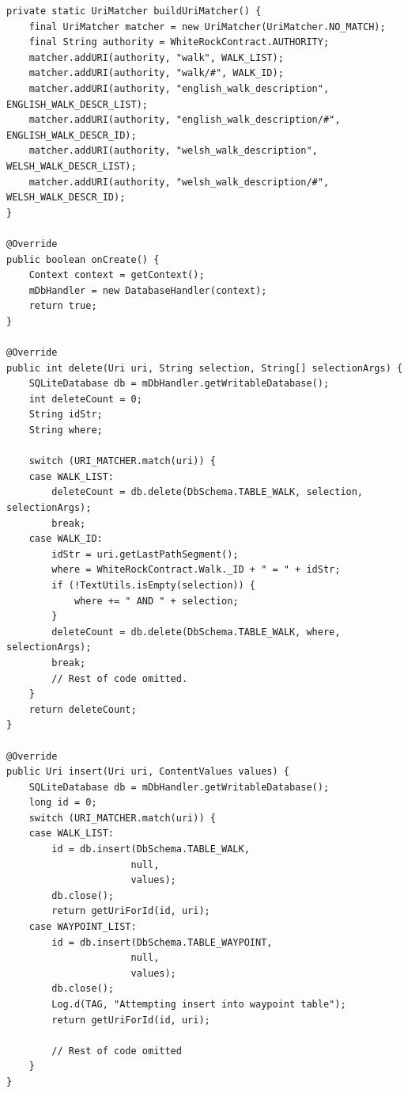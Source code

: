 \documentclass[11pt,a4paper]{article}
\begin{document}
\begin{lstlisting}[captionpos=b, caption=WhiteRockContentProvider Snippet, label=lst:contentprovider, frame=single]
private static UriMatcher buildUriMatcher() {
    final UriMatcher matcher = new UriMatcher(UriMatcher.NO_MATCH);
    final String authority = WhiteRockContract.AUTHORITY;
    matcher.addURI(authority, "walk", WALK_LIST);
    matcher.addURI(authority, "walk/#", WALK_ID);
    matcher.addURI(authority, "english_walk_description", ENGLISH_WALK_DESCR_LIST);
    matcher.addURI(authority, "english_walk_description/#", ENGLISH_WALK_DESCR_ID);
    matcher.addURI(authority, "welsh_walk_description", WELSH_WALK_DESCR_LIST);
    matcher.addURI(authority, "welsh_walk_description/#", WELSH_WALK_DESCR_ID);
}

@Override
public boolean onCreate() {
    Context context = getContext();
    mDbHandler = new DatabaseHandler(context);
    return true;
}

@Override
public int delete(Uri uri, String selection, String[] selectionArgs) {
    SQLiteDatabase db = mDbHandler.getWritableDatabase();
    int deleteCount = 0;
    String idStr;
    String where;

    switch (URI_MATCHER.match(uri)) {
    case WALK_LIST:
        deleteCount = db.delete(DbSchema.TABLE_WALK, selection, selectionArgs);
        break;
    case WALK_ID:
        idStr = uri.getLastPathSegment();
        where = WhiteRockContract.Walk._ID + " = " + idStr;
        if (!TextUtils.isEmpty(selection)) {
            where += " AND " + selection;
        }
        deleteCount = db.delete(DbSchema.TABLE_WALK, where, selectionArgs);
        break;
        // Rest of code omitted.
    }
    return deleteCount;
}

@Override
public Uri insert(Uri uri, ContentValues values) {
    SQLiteDatabase db = mDbHandler.getWritableDatabase();
    long id = 0;
    switch (URI_MATCHER.match(uri)) {
    case WALK_LIST:
        id = db.insert(DbSchema.TABLE_WALK,
                      null,
                      values);
        db.close();
        return getUriForId(id, uri);
    case WAYPOINT_LIST:
        id = db.insert(DbSchema.TABLE_WAYPOINT,
                      null,
                      values);
        db.close();
        Log.d(TAG, "Attempting insert into waypoint table");
        return getUriForId(id, uri);

        // Rest of code omitted
    }
}


\end{lstlisting}
\end{document}
